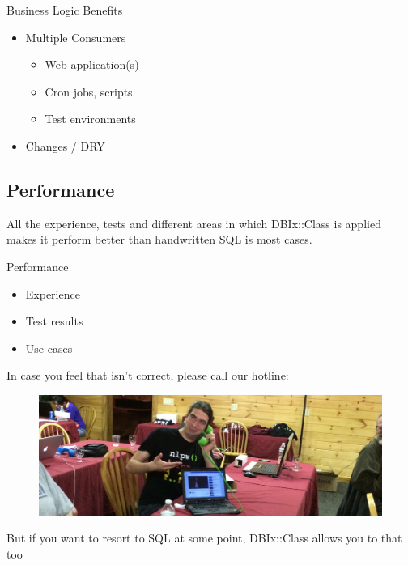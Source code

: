 \begin{frame}{Business Logic Benefits}
\begin{itemize}
\item Multiple Consumers
\begin{itemize}
\item Web application(s)
\item Cron jobs, scripts
\item Test environments
\end{itemize}
\item Changes / DRY
\end{itemize}
\end{frame}

\subsection{Performance}

All the experience, tests and different areas in which 
DBIx::Class is applied makes it perform better than
handwritten SQL is most cases.

\begin{frame}{Performance}
\begin{itemize}
\item Experience
\item Test results
\item Use cases
\end{itemize}
\end{frame}
 
In case you feel that isn't correct, please call our hotline:

\begin{frame}
\begin{figure}[!ht]
\centering
\includegraphics[width=1\linewidth]{img/perldance-2014-modern-tech.jpg}
\end{figure}
\end{frame}

But if you want to resort to SQL at some point, DBIx::Class allows you
to that too


